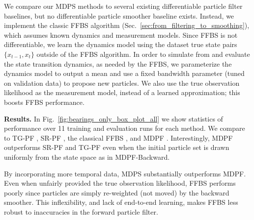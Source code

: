     We compare our MDPS methods to several existing differentiable particle filter baselines, but no differentiable particle smoother baseline exists. Instead, we implement the classic FFBS \cite{doucet2009tutorial, Klaas2006FastPS} algorithm (Sec.~\ref{sec:from_filtering_to_smoothing}), which assumes known dynamics and measurement models. Since FFBS is not differentiable, we learn the dynamics model using the dataset true state pairs $\{x_{t-1}, x_{t}\}$ outside of the FFBS algorithm. In order to simulate from and evaluate the state transition dynamics, as needed by the FFBS, we parameterize the dynamics model to output a mean and use a fixed bandwidth parameter (tuned on validation data) to propose new particles. We also use the true observation likelihood as the measurement model, instead of a learned approximation; this boosts FFBS performance.

    \textbf{Results.} In Fig.~\ref{fig:bearings_only_box_plot_all} we show statistics of performance over 11 training and evaluation runs for each method. We compare to TG-PF \cite{jonschkowski18_differentiable_particle_filter}, SR-PF \cite{pmlr-v87-karkus18a_soft_resampling}, the classical FFBS \cite{doucet2009tutorial, Klaas2006FastPS}, and MDPF \cite{younis2023mdpf}. 
    Interestingly, MDPF outperforms SR-PF and TG-PF even when the initial particle set is drawn uniformly from the state space as in MDPF-Backward. 
    
    By incorporating more temporal data, MDPS substantially outperforms MDPF. Even when unfairly provided the true observation likelihood, FFBS performs poorly since particles are simply re-weighted (not moved) by the backward smoother.  This inflexibility, and lack of end-to-end learning, makes FFBS less robust to inaccuracies in the forward particle filter. %
    
